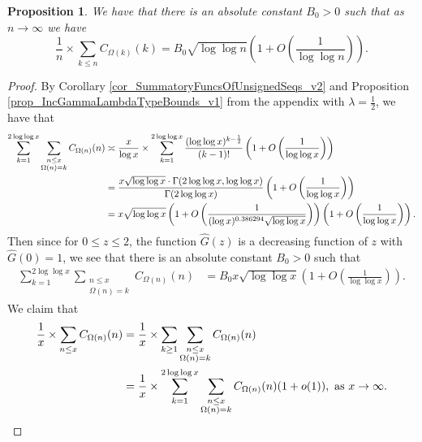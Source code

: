 \documentclass[11pt,reqno,a4letter]{article}
\numberwithin{figure}{section}
\numberwithin{table}{section}
\theoremstyle{plain}
\newtheorem{prop}[theorem]{Proposition}
\numberwithin{theorem}{section}
\theoremstyle{definition}
\begin{document}
\begin{prop} 
\label{lemma_HatCAstxSum_ExactFormulaWithError_v1} 
We have that there is an absolute constant $B_0 > 0$ such that 
as $n \rightarrow \infty$ we have 
\[
\frac{1}{n} \times \sum_{k \leq n} C_{\Omega(k)}(k) = 
     B_0\sqrt{\log\log n}\left(1 + O\left(\frac{1}{\log\log n}\right)\right). 
\] 
\end{prop} 
\begin{proof} 
By Corollary \ref{cor_SummatoryFuncsOfUnsignedSeqs_v2} and 
Proposition \ref{prop_IncGammaLambdaTypeBounds_v1} from the appendix 
with $\lambda = \frac{1}{2}$, we have that 
\begin{align} 
\notag 
\sum_{k=1}^{2\log\log x} \sum_{\substack{n \leq x \\ \Omega(n) = k}} C_{\Omega(n)}(n) & \asymp 
     \frac{x}{\log x} \times \sum_{k=1}^{2\log\log x} \frac{(\log\log x)^{k-\frac{1}{2}}}{(k-1)!} 
     \left(1 + O\left(\frac{1}{\log\log x}\right)\right) \\ 
\notag 
     & = \frac{x \sqrt{\log\log x} \cdot \Gamma(2\log\log x, \log\log x)}{\Gamma(2\log\log x)} 
     \left(1 + O\left(\frac{1}{\log\log x}\right)\right) \\ 
\notag 
     & = x \sqrt{\log\log x} \left(1 + O\left(\frac{1}{(\log x)^{0.386294} \sqrt{\log\log x}}\right)\right) 
     \left(1 + O\left(\frac{1}{\log\log x}\right)\right). 
\end{align}
Then since for $0 \leq z \leq 2$, the function $\widehat{G}(z)$ is a decreasing function of 
$z$ with $\widehat{G}(0) = 1$, we see that there is an absolute constant $B_0 > 0$ such that 
\begin{align} 
\label{eqn_proof_tag_PartialSumsOver_HatCkx_v3} 
\sum_{k=1}^{2\log\log x} \sum_{\substack{n \leq x \\ \Omega(n) = k}} C_{\Omega(n)}(n) & = 
     B_0 x \sqrt{\log\log x} \left(1 + O\left(\frac{1}{\log\log x}\right)\right). 
\end{align} 
We claim that 
\begin{align} 
\notag 
\frac{1}{x} \times \sum_{n \leq x} C_{\Omega(n)}(n) & = \frac{1}{x} \times 
     \sum_{k \geq 1} \sum_{\substack{n \leq x \\ \Omega(n) = k}} C_{\Omega(n)}(n) \\ 
\label{eqn_proof_tag_PartialSumsOver_HatCkx_v1} 
     & = 
     \frac{1}{x} \times \sum_{k=1}^{2\log\log x} \sum_{\substack{n \leq x \\ \Omega(n) = k}} 
     C_{\Omega(n)}(n) (1+o(1)), 
     \text{ as } x \rightarrow \infty. 

\end{align}
\end{proof}
\end{document}
